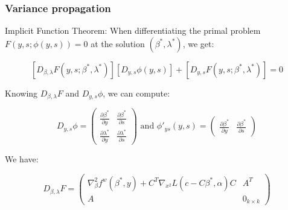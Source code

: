 \documentclass[aspectratio=169]{beamer}
\begin{document}
\begin{frame}
	\frametitle{Variance propagation}
	Implicit Function Theorem: When differentiating the primal problem $F \left( y , s ; \phi \left( y , s \right) \right) = 0$ at the solution $\left( \beta^* , \lambda^* \right)$, we get:

	\begin{equation*}
	\left[ D_{\beta , \lambda} F \left( y , s ; \beta^* , \lambda^* \right) \right] \left[ D_{y , s} \phi \left( y , s \right) \right] + \left[ D_{y , s} F \left( y , s ; \beta^* , \lambda^* \right) \right] = 0
	\end{equation*}

	\vspace{1em}

	Knowing $D_{\beta , \lambda} F$ and $D_{y , s} \phi$, we can compute:

	\begin{equation*}
	D_{y , s} \phi = \begin{pmatrix} \frac{\partial \beta^*}{\partial y} & \frac{\partial \beta^*}{\partial s} \\ \frac{\partial \lambda^*}{\partial y} & \frac{\partial \lambda^*}{\partial s} \end{pmatrix} \text{ and } \phi'_{ys} \left( y , s \right) = \begin{pmatrix} \frac{\partial \beta^*}{\partial y} & \frac{\partial \beta^*}{\partial s} \end{pmatrix}
	\end{equation*}

	We have:

	\begin{equation*}
	D_{\beta , \lambda} F = \begin{pmatrix} \nabla^2_\beta f^w \left( \beta^* , y \right) + C^T \nabla_{x^2} L \left( c - C \beta^* , \alpha \right) C & A^T \\ A & 0_{k \times k} \end{pmatrix}
	\end{equation*}

\end{frame}
\end{document}
